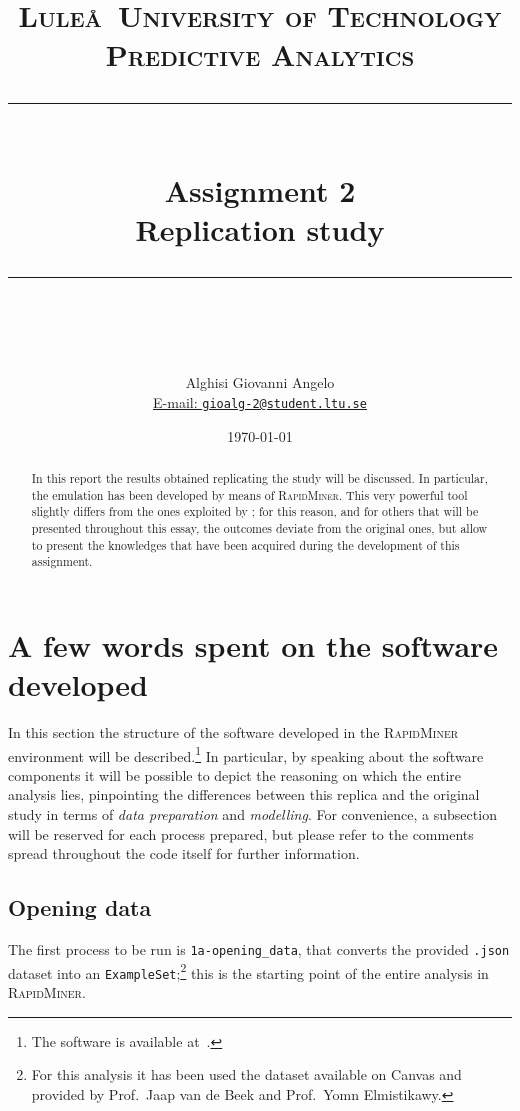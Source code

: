 \documentclass[a4paper]{article}
\title{
	\large 
	\textsc{Lule\aa~University of Technology\\[5pt] 
		Predictive Analytics} \\[10pt]
	\rule{\linewidth}{0.5pt}\\
	\vspace{0.3cm}
	\Large Assignment 2\\
	\vspace{0.3cm}
	\huge \bf Replication study\normalsize
	\vspace{0.3cm}
	\rule{\linewidth}{0.5pt}  \\
}
\author{Alghisi Giovanni Angelo\\
		\href{mailto:gioalg-2@student.ltu.se}{E-mail: \texttt{gioalg-2@student.ltu.se}}
}
\date{\normalsize \today}
\begin{document}
	
	\renewcommand{\tableautorefname}{Tab.} %
	\renewcommand{\figureautorefname}{Tab.} %
	
	\maketitle
	
	\begin{abstract}
		In this report the results obtained replicating the study \cite{article:muller} will be discussed. In particular, the emulation has been developed by means of \textsc{RapidMiner}. This very powerful tool slightly differs from the ones exploited by \citeauthor{article:muller}; for this reason, and for others that will be presented throughout this essay, the outcomes deviate from the original ones, but allow to present the knowledges that have been acquired during the development of this assignment. 
	\end{abstract}
	
	\tableofcontents
	
	
	\section{A few words spent on the software developed}
		In this section the structure of the software developed in the \textsc{RapidMiner} environment will be described.\footnote{The software is available at~\cite{repo:pa-assignment-2}.} In particular, by speaking about the software components it will be possible to depict the reasoning on which the entire analysis lies, pinpointing the differences between this replica and the original study in terms of \emph{data preparation} and \emph{modelling}. For convenience, a subsection will be reserved for each process prepared, but please refer to the comments spread throughout the code itself for further information.
		
		\subsection{Opening data}
		 	The first process to be run is \verb|1a-opening_data|, that converts the provided \verb|.json| dataset into an \verb|ExampleSet|;\footnote{For this analysis it has been used the dataset available on Canvas and provided by Prof.~Jaap van de Beek and Prof.~Yomn Elmistikawy.} this is the starting point of the entire analysis in \textsc{RapidMiner}.
		 
\end{document}

